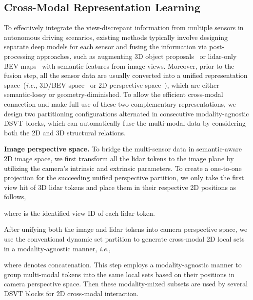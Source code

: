 \documentclass[10pt,twocolumn,letterpaper]{article}
\begin{document}
\subsection{Cross-Modal Representation Learning} \label{sec:cross-modal}
To effectively integrate the view-discrepant information from multiple sensors in autonomous driving scenarios, existing methods typically involve designing separate deep models for each sensor and fusing the information via post-processing approaches, such as augmenting 3D object proposals~\cite{bai2022transfusion} or lidar-only BEV maps~\cite{liu2022bevfusion,liang2022bevfusion} with semantic features from image views. Moreover, prior to the fusion step, all the sensor data are usually converted into a unified representation space~(\emph{i.e.}, 3D/BEV space~\cite{liu2022bevfusion,liang2022bevfusion} or 2D perspective space~\cite{bai2022transfusion,yang2022boosting}), which are either semantic-lossy or geometry-diminished. To allow the efficient cross-modal connection and make full use of these two complementary representations, we design two partitioning configurations alternated in consecutive modality-agnostic DSVT blocks, which can automatically fuse the multi-modal data by considering both the 2D and 3D structural relations.

\noindent \textbf{Image perspective space.} To bridge the multi-sensor data in semantic-aware 2D image space, we first transform all the lidar tokens to the image plane by utilizing the camera's intrinsic and extrinsic parameters. To create a one-to-one projection for the succeeding unified perspective partition, we only take the first view hit of 3D lidar tokens and place them in their respective 2D positions as follows,
\vspace{-2pt}

where  is the identified view ID of each lidar token.

After unifying both the image and lidar tokens into camera perspective space, we use the conventional dynamic set partition to generate  cross-modal 2D local sets in a modality-agnostic manner, \textit{i.e.},
\vspace{-2pt}

where  denotes concatenation. This step employs a modality-agnostic manner to group multi-modal tokens into the same local sets based on their positions in camera perspective space. Then these modality-mixed subsets are used by several DSVT blocks for 2D cross-modal interaction.
\end{document}

